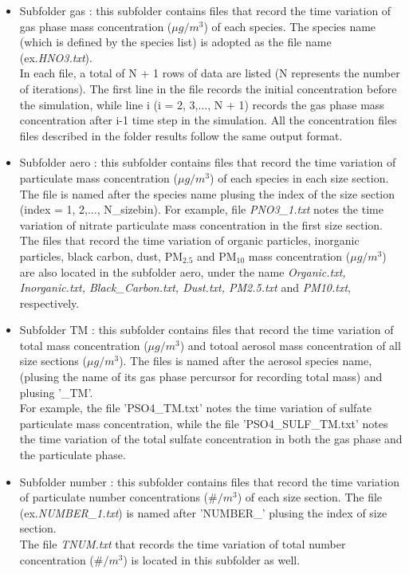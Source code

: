\documentclass[a4paper,11pt]{article}
\begin{document}
\begin{itemize}
	\item Subfolder gas : this subfolder contains files that record the time variation of gas phase mass concentration ($\mu g/m^3$) of each species.
	 The species name (which is defined by the species list) is adopted as the file name (ex.\textit{HNO3.txt}).\\ 
	 In each file, a total of N + 1 rows of data are listed (N represents the number of iterations). The first line in the file records the initial concentration before the simulation, while line i (i = 2, 3,..., N + 1) records the gas phase mass concentration after i-1 time step in the simulation. All the concentration files files described in the folder results follow the same output format.
	 
	\item Subfolder aero : this subfolder contains files that record the time variation of particulate mass concentration ($\mu g/m^3$) of each species in each size section. The file is named after the species name plusing the index of the size section (index = 1, 2,..., N\_sizebin). For example, file \textit{PNO3\_1.txt} notes the time variation of nitrate particulate mass concentration in the first size section.\\ 
	The files that record the time variation of organic particles, inorganic particles, black carbon, dust, PM$_{2.5}$ and PM$_{10}$ mass concentration ($\mu g/m^3$) are also located in the subfolder aero, under the name \textit{Organic.txt, Inorganic.txt, Black\_Carbon.txt, Dust.txt, PM2.5.txt} and \textit{PM10.txt}, respectively.

	\item Subfolder TM : this subfolder contains files that record the time variation of total mass concentration ($\mu g/m^3$) and totoal aerosol mass concentration of all size sections ($\mu g/m^3$). The files is named after the aerosol species name, (plusing the name of its gas phase percursor for recording total mass) and plusing '\_TM'.\\ 
	For example, the file 'PSO4\_TM.txt' notes the time variation of sulfate particulate mass concentration, while the file 'PSO4\_SULF\_TM.txt' notes the time variation of the total sulfate concentration in both the gas phase and the particulate phase.
	
	\item Subfolder number : this subfolder contains files that record the time variation of particulate number concentrations ($ \# /m^3$) of each size section. The file (ex.\textit{NUMBER\_1.txt}) is named after 'NUMBER\_' plusing the index of size section. \\ The file \textit{TNUM.txt} that records the time variation of total number concentration ($ \# /m^3$) is located in this subfolder as well.
	

\end{itemize}
\end{document}
